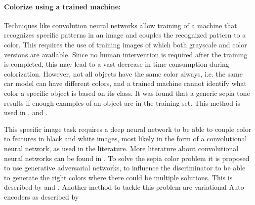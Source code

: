 \paragraph{Colorize using a trained machine:} Techniques like convolution neural networks allow training of a machine that recognizes specific patterns in an image and couples the recognized pattern to a color. This requires the use of training images of which both grayscale and color versions are available. Since no human intervention is required after the training is completed, this may lead to a vast decrease in time consumption during colorization. However, not all objects have the same color always, i.e. the same car model can have different colors, and a trained machine cannot identify what color a specific object is based on its class. It was found that a generic sepia tone results if enough examples of an object are in the training set. This method is used in \cite{Cheng}, \cite{Ho} and \cite{Krizhevsky}.

This specific image task requires a deep neural network to be able to couple color to features in black and white images, most likely in the form of a convolutional neural network, as used in the literature. More literature about convolutional neural networks can be found in . To solve the sepia color problem it is proposed to use generative adversarial networks, to influence the discriminator to be able to generate the right colors where there could be multiple solutions. This is described by \cite{Goodfellow} and \cite{Radford}. Another method to tackle this problem are variational Auto-encoders as described by  










